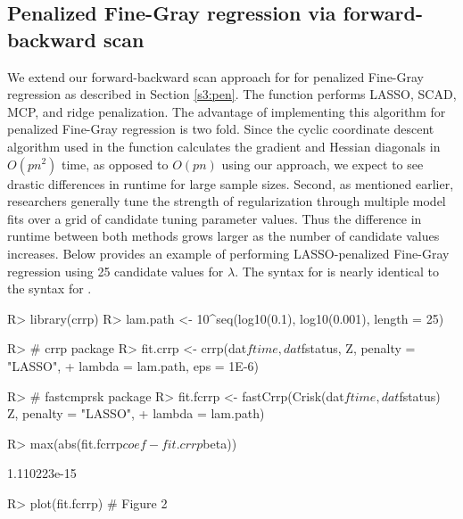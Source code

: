 \subsection{Penalized Fine-Gray regression via forward-backward scan}
We extend our forward-backward scan approach for for penalized Fine-Gray regression as described in Section \ref{s3:pen}.  The  function performs LASSO, SCAD, MCP, and ridge \citep{hoerl1970ridge} penalization.  The advantage of implementing this algorithm for penalized Fine-Gray regression is two fold. Since the cyclic coordinate descent algorithm used in the  function calculates the gradient and Hessian diagonals in $O(pn^2)$ time, as opposed to $O(pn)$ using our approach, we expect to see drastic differences in runtime for large sample sizes. Second, as mentioned earlier, researchers generally tune the strength of regularization through multiple model fits over a grid of candidate tuning parameter values. Thus the difference in runtime between both methods grows larger as the number of candidate values increases. Below provides an example of performing LASSO-penalized Fine-Gray regression using 25 candidate values for $\lambda$. The syntax for  is nearly identical to the syntax for . 
\begin{example}
R> library(crrp)
R> lam.path <- 10^seq(log10(0.1), log10(0.001), length = 25)

R> # crrp package
R> fit.crrp <- crrp(dat$ftime, dat$fstatus, Z, penalty = "LASSO",
+                         lambda = lam.path, eps = 1E-6)

R> # fastcmprsk package
R> fit.fcrrp <- fastCrrp(Crisk(dat$ftime, dat$fstatus) ~ Z, penalty = "LASSO",
+                                    lambda = lam.path)


R> max(abs(fit.fcrrp$coef - fit.crrp$beta))
\end{example}
\begin{example}
[1] 1.110223e-15
\end{example}
\begin{example}
R> plot(fit.fcrrp) # Figure 2
\end{example}

